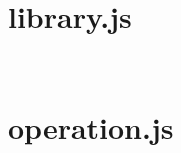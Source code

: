 \begin{lstlisting}[language=bash]

\end{lstlisting}



\section{library.js}



\begin{lstlisting}[language=bash]

\end{lstlisting}



\begin{lstlisting}[language=bash]

\end{lstlisting}


\section{operation.js}




